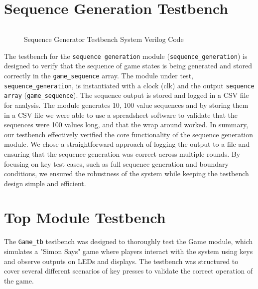 \documentclass{report}
\begin{document}
\section{Sequence Generation Testbench}
\begin{figure}[h]
    \inputminted{sv}{../sequence_testbench.sv}
    \caption{Sequence Generator Testbench System Verilog Code}
\end{figure}

The testbench for the \verb|sequence generation| module (\verb|sequence_generation|) is designed to verify that the sequence of game states is being generated and stored correctly in the \verb|game_sequence| array. The module under test, \verb|sequence_generation|, is instantiated with a clock (clk) and the output \verb|sequence array| (\verb|game_sequence|). The sequence output is stored and logged in a CSV file for analysis. The module generates 10, 100 value sequences and by storing them in a CSV file we were able to use a spreadsheet software to validate that the sequences were 100 values long, and that the wrap around worked. In summary, our testbench effectively verified the core functionality of the sequence generation module. We chose a straightforward approach of logging the output to a file and ensuring that the sequence generation was correct across multiple rounds. By focusing on key test cases, such as full sequence generation and boundary conditions, we ensured the robustness of the system while keeping the testbench design simple and efficient.

\newpage
\section{Top Module Testbench}
The \verb|Game_tb| testbench was designed to thoroughly test the Game module, which simulates a "Simon Says" game where players interact with the system using keys and observe outputs on LEDs and displays. The testbench was structured to cover several different scenarios of key presses to validate the correct operation of the game.
\end{document}
